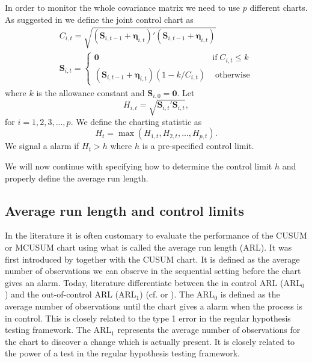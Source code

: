 In order to monitor the whole covariance matrix we need to use $p$ different charts. As suggested in \citet{Bodnar2009} we define the joint control chart as  
\begin{align}
&C_{i,t}=\sqrt{(\mathbf{S}_{i,t-1}+\boldsymbol{\eta}_{i,t})'(\mathbf{S}_{i,t-1}+\boldsymbol{\eta}_{i,t})} & \\ 
&\mathbf{S}_{i,t}=\begin{cases}
\mathbf{0} & \text{if} \; C_{i,t} \leq k \\
(\mathbf{S}_{i,t-1}+\boldsymbol{\eta}_{i,t})(1-k/C_{i,t}) & \text{ otherwise}
\end{cases} &
\end{align}
where $k$ is the allowance constant and $\mathbf{S}_{i,0}=\mathbf{0}$. Let 
\begin{equation}
H_{i,t}=\sqrt{\mathbf{S}_{i,t}'\mathbf{S}_{i,t}},
\end{equation} 
for $i=1,2,3,...,p$. We define the charting statistic as
$$
H_t = \max(H_{1,t},H_{2,t},...,H_{p,t}).
$$
We signal a alarm if $H_t>h$ where $h$ is a pre-specified control limit.

We will now continue with specifying how to determine the control limit $h$ and properly define the average run length. 


\subsection{Average run length and control limits}\label{AVERG}
In the literature it is often customary to evaluate the performance of the CUSUM or MCUSUM chart using what is called the average run length (ARL). It was first introduced by \citet{ESPAGE} together with the CUSUM chart. It is defined as the average number of observations we can observe in the sequential setting before the chart gives an alarm. Today, literature  differentiate between the in control ARL (ARL$_0$) and the out-of-control ARL (ARL$_1$) (cf. \citet{SPCIntro} or \citet{SPCTomotherapy}). The ARL$_0$ is defined as the average number of observations until the chart gives a alarm when the process is in control. This is closely related to the type 1 error in the regular hypothesis testing framework. The ARL$_1$ represents the average number of observations for the chart to discover a change which is actually present. It is closely related to the power of a test in the regular hypothesis testing framework. 
 

